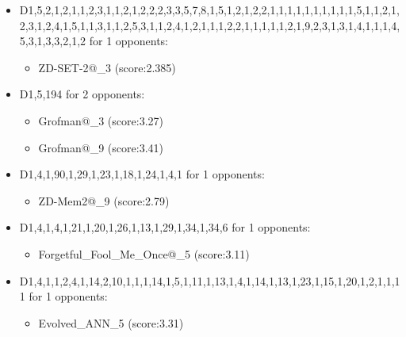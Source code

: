 \begin{appendices}
\begin{itemize}
        \item D1,5,2,1,2,1,1,2,3,1,1,2,1,2,2,2,3,3,5,7,8,1,5,1,2,1,2,2,1,1,1,1,1,1,1,1,1,1,5,1,1,2,1,2,3,1,2,4,1,5,1,1,3,1,1,2,5,3,1,1,2,4,1,2,1,1,1,2,2,1,1,1,1,1,2,1,9,2,3,1,3,1,4,1,1,1,4,5,3,1,3,3,2,1,2 for 1 opponents:
        \begin{multicols}{3}
            \begin{itemize}
                \item ZD-SET-2@\_3 (score:2.385)
            \end{itemize}
        \end{multicols}

        \item D1,5,194 for 2 opponents:
        \begin{multicols}{3}
            \begin{itemize}
                \item Grofman@\_3 (score:3.27)
                \item Grofman@\_9 (score:3.41)
            \end{itemize}
        \end{multicols}

        \item D1,4,1,90,1,29,1,23,1,18,1,24,1,4,1 for 1 opponents:
        \begin{multicols}{3}
            \begin{itemize}
                \item ZD-Mem2@\_9 (score:2.79)
            \end{itemize}
        \end{multicols}

        \item D1,4,1,4,1,21,1,20,1,26,1,13,1,29,1,34,1,34,6 for 1 opponents:
        \begin{multicols}{3}
            \begin{itemize}
                \item Forgetful\_Fool\_Me\_Once@\_5 (score:3.11)
            \end{itemize}
        \end{multicols}

        \item D1,4,1,1,2,4,1,14,2,10,1,1,1,14,1,5,1,11,1,13,1,4,1,14,1,13,1,23,1,15,1,20,1,2,1,1,11 for 1 opponents:
        \begin{multicols}{3}
            \begin{itemize}
                \item Evolved\_ANN\_5 (score:3.31)
            \end{itemize}
        \end{multicols}


\end{itemize}
\end{appendices}
